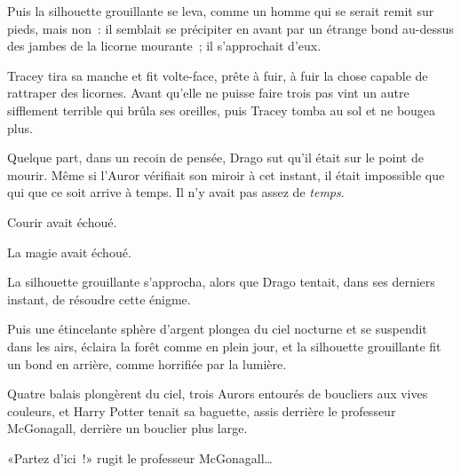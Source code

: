 Puis la silhouette grouillante se leva, comme un homme qui se serait remit sur pieds, mais non~: il semblait se précipiter en avant par un étrange bond au-dessus des jambes de la licorne mourante~; il s'approchait d'eux.

Tracey tira sa manche et fit volte-face, prête à fuir, à fuir la chose capable de rattraper des licornes. Avant qu'elle ne puisse faire trois pas vint un autre sifflement terrible qui brûla ses oreilles, puis Tracey tomba au sol et ne bougea plus.

Quelque part, dans un recoin de pensée, Drago sut qu'il était sur le point de mourir. Même si l'Auror vérifiait son miroir à cet instant, il était impossible que qui que ce soit arrive à temps. Il n'y avait pas assez de \emph{temps}.

Courir avait échoué.

La magie avait échoué.

La silhouette grouillante s'approcha, alors que Drago tentait, dans ses derniers instant, de résoudre cette énigme.

Puis une étincelante sphère d'argent plongea du ciel nocturne et se suspendit dans les airs, éclaira la forêt comme en plein jour, et la silhouette grouillante fit un bond en arrière, comme horrifiée par la lumière.

Quatre balais plongèrent du ciel, trois Aurors entourés de boucliers aux vives couleurs, et Harry Potter tenait sa baguette, assis derrière le professeur McGonagall, derrière un bouclier plus large.

«Partez d'ici~!» rugit le professeur McGonagall…

